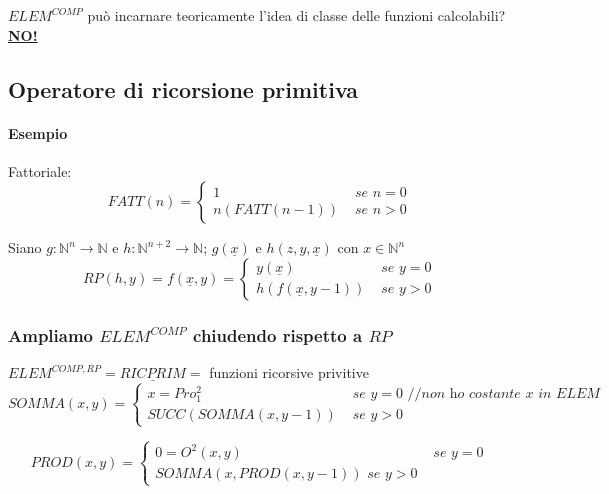 \documentclass{article}
\begin{document}
$ELEM^{COMP}$ può incarnare teoricamente l'idea di classe delle funzioni calcolabili? \underline{\textbf{NO!}}

\subsection{Operatore di ricorsione primitiva}
\paragraph{Esempio} Fattoriale:
\begin{displaymath}
	FATT(n)=	
	\begin{cases}
		1 &\textit{ se } n = 0 \\
		n(FATT(n-1)) &\textit{ se } n > 0
	\end{cases}
\end{displaymath}

Siano $g:\mathbb{N}^n \rightarrow \mathbb{N}$ e $ h:\mathbb{N}^{n+2} \rightarrow \mathbb{N} $; $g(\underline{x})$ e $h(z,y,\underline{x})$ con $x \in \mathbb{N}^n$
\begin{displaymath}
	RP(h,y)=	f(\underline{x},y)=
	\begin{cases}
		y(\underline{x}) & \textit{ se } y=0 \\
		h(f(\underline{x}, y-1)) & \textit{ se } y>0 
	\end{cases}
\end{displaymath}

\subsubsection{Ampliamo $ELEM^{COMP}$ chiudendo rispetto a $RP$}
$ELEM^{COMP,RP}=\underline{RICPRIM}=$ {funzioni ricorsive privitive}
\begin{displaymath}
	SOMMA(x,y)=
	\begin{cases}
		x=Pro_1^2 &\textit{ se } y=0  \textit{ //non ho costante $x$ in $ELEM$} \\
		SUCC(SOMMA(x,y-1)) &\textit{ se } y>0
	\end{cases}
\end{displaymath}

\begin{displaymath}
	PROD(x,y)=
	\begin{cases}
		0=O^2(x,y) &\textit{ se } y=0  \\
		SOMMA(x,PROD(x,y-1)) \textit{ se } y>0
	\end{cases}
\end{displaymath}
\end{document}
